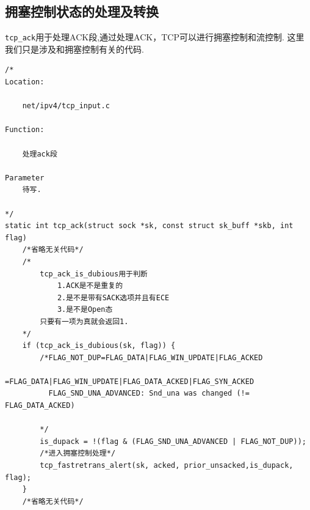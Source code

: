 	\subsection{拥塞控制状态的处理及转换}
		\texttt{tcp_ack}用于处理ACK段,通过处理ACK，TCP可以进行拥塞控制和流控制.
		这里我们只是涉及和拥塞控制有关的代码.
\begin{verbatim}
/*
Location:

	net/ipv4/tcp_input.c

Function:

	处理ack段

Parameter
	待写.
		
*/
static int tcp_ack(struct sock *sk, const struct sk_buff *skb, int flag)
	/*省略无关代码*/
	/*
		tcp_ack_is_dubious用于判断
			1.ACK是不是重复的
			2.是不是带有SACK选项并且有ECE	
			3.是不是Open态
		只要有一项为真就会返回1.
	*/
	if (tcp_ack_is_dubious(sk, flag)) {
		/*FLAG_NOT_DUP=FLAG_DATA|FLAG_WIN_UPDATE|FLAG_ACKED
					  =FLAG_DATA|FLAG_WIN_UPDATE|FLAG_DATA_ACKED|FLAG_SYN_ACKED
		  FLAG_SND_UNA_ADVANCED: Snd_una was changed (!= FLAG_DATA_ACKED) 

		*/		
		is_dupack = !(flag & (FLAG_SND_UNA_ADVANCED | FLAG_NOT_DUP));
		/*进入拥塞控制处理*/
		tcp_fastretrans_alert(sk, acked, prior_unsacked,is_dupack, flag);
	}
	/*省略无关代码*/
\end{verbatim}
